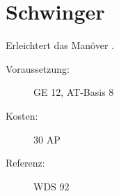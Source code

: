 \section{Schwinger}
\label{sf.schwinger}
Erleichtert das Manöver .
\begin{description}
    \item[Voraussetzung:]
        GE 12, AT-Basis 8
    \item [Kosten:]
        30 AP
    \item [Referenz:]
        WDS 92
\end{description}

